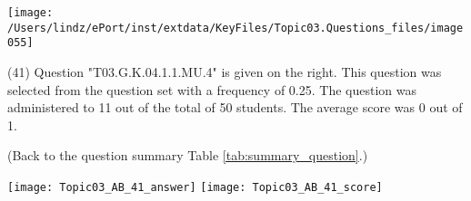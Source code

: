 \documentclass[12pt,english,nohyper]{tufte-handout}\usepackage[]{graphicx}\usepackage[]{color}
\begin{document}
\vspace{5cm}\begin{marginfigure}\texttt{[image: /Users/lindz/ePort/inst/extdata/KeyFiles/Topic03.Questions\_files/image055]}\end{marginfigure}\vspace{-5cm} (41) Question "T03.G.K.04.1.1.MU.4" is given on the right. This question was selected from the question set with a frequency of 0.25. The question was administered to 11 out of the total of 50 students. The average score was 0 out of 1.

 (Back to the question summary Table \ref{tab:summary_question}.)

\begin{center} \texttt{[image: Topic03\_AB\_41\_answer]} \texttt{[image: Topic03\_AB\_41\_score]} \end{center} 
\end{document}
